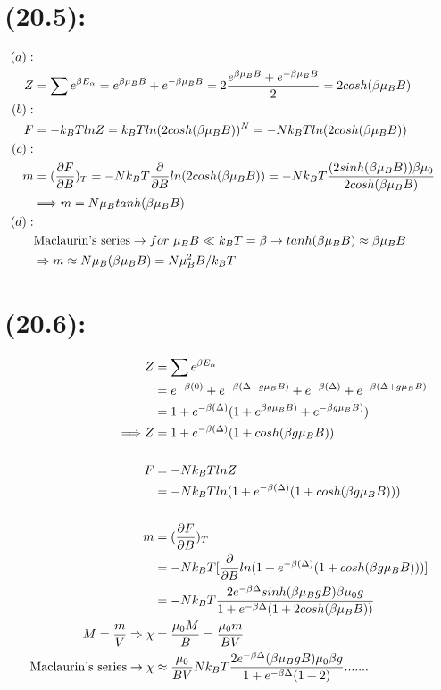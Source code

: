 \begin{latin}
    \section*{(20.5):}
    \begin{alignat*}{2}
        (a):\\
        Z &= \sum e^{\beta E_{\alpha}} = e^{\beta \mu_B B} + e^{-\beta \mu_B B} = 2\frac{e^{\beta \mu_B B} + e^{-\beta \mu_B B}}{2} = 2 cosh(\beta \mu_B B)\\
        (b):\\
        F&= -k_B TlnZ = k_B T ln(2 cosh(\beta \mu_B B))^N = -Nk_B T ln (2 cosh(\beta \mu_B B))\\
        (c):\\
        m &= (\frac{\partial F}{\partial B})_T = -Nk_B T \frac{\partial }{\partial B} ln (2 cosh(\beta \mu_B B)) = -Nk_B T \frac{(2 sinh(\beta \mu_B B))\beta\mu_0}{2 cosh(\beta \mu_B B)}\\
        &\Longrightarrow m= N\mu_B tanh(\beta \mu_B B)\\
        (d):\\
        &\textmd{Maclaurin's series}\to for \ \mu_B B \ll k_BT = \beta \to tanh(\beta \mu_B B)\approx \beta \mu_B B \\
        &\Rightarrow m\approx N\mu_B (\beta \mu_B B) = N\mu_B^2  B/k_BT
    \end{alignat*}
    \section*{(20.6):}
    \begin{alignat*}{2}
        Z &= \sum e^{\beta E_{\alpha}}\\
        &= e^{-\beta(0)} + e^{-\beta(\Delta - g\mu_B B)} +e^{-\beta(\Delta)} + e^{-\beta(\Delta + g\mu_B B)}\\
        &= 1+ e^{-\beta(\Delta)} (1 +e^{\beta g\mu_B B)}+e^{-\beta g\mu_B B)} )\\
        \Longrightarrow Z&= 1 + e^{-\beta(\Delta)}(1 + cosh(\beta g\mu_B B)) \\\\
        F&= -Nk_BT lnZ \\
        &=-Nk_BT ln(1 + e^{-\beta(\Delta)}(1 + cosh(\beta g\mu_B B)))\\\\
        m &= (\frac{\partial F}{\partial B})_T\\
        &= -Nk_BT [\frac{\partial }{\partial B}ln(1 + e^{-\beta(\Delta)}(1 + cosh(\beta g\mu_B B)))]\\
        &= -Nk_B T \frac{2 e^{-\beta \Delta}sinh(\beta \mu_B gB)\beta\mu_0 g}{1+e^{-\beta \Delta}(1+ 2 cosh(\beta \mu_B B))}\\
        M = \frac{m}{V}\Rightarrow \chi &=\frac{\mu_0 M}{B} = \frac{\mu_0 m}{BV} \\
        \textmd{Maclaurin's series}\to \chi &\approx \frac{\mu_0 }{BV}Nk_BT\frac{2 e^{-\beta \Delta}(\beta \mu_B gB)\mu_0 \beta g}{1+e^{-\beta \Delta}(1+ 2 )} .......
    \end{alignat*}

\end{latin}
